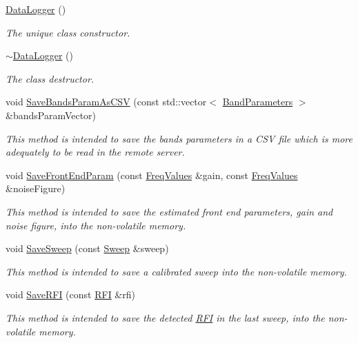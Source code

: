 \begin{DoxyCompactItemize}
\item 
\hyperlink{classDataLogger_a7abebacd4747644d22982f9676466bad}{Data\+Logger} ()
\begin{DoxyCompactList}\small\item\em The unique class constructor. \end{DoxyCompactList}\item 
\mbox{\label{classDataLogger_a9aaff109f3e7749a0a0a0313655da50a}} 
\hyperlink{classDataLogger_a9aaff109f3e7749a0a0a0313655da50a}{$\sim$\+Data\+Logger} ()
\begin{DoxyCompactList}\small\item\em The class destructor. \end{DoxyCompactList}\item 
void \hyperlink{classDataLogger_a2ffe9fb45883c2880e1c45a4406fc22b}{Save\+Bands\+Param\+As\+C\+SV} (const std\+::vector$<$ \hyperlink{structBandParameters}{Band\+Parameters} $>$ \&bands\+Param\+Vector)
\begin{DoxyCompactList}\small\item\em This method is intended to save the bands parameters in a C\+SV file which is more adequately to be read in the remote server. \end{DoxyCompactList}\item 
void \hyperlink{classDataLogger_a058ed66d04269e7d37501ecfe775c067}{Save\+Front\+End\+Param} (const \hyperlink{structFreqValues}{Freq\+Values} \&gain, const \hyperlink{structFreqValues}{Freq\+Values} \&noise\+Figure)
\begin{DoxyCompactList}\small\item\em This method is intended to save the estimated front end parameters, gain and noise figure, into the non-\/volatile memory. \end{DoxyCompactList}\item 
void \hyperlink{classDataLogger_ab2063fcd87971520a5bfa5aef6d73fea}{Save\+Sweep} (const \hyperlink{structSweep}{Sweep} \&sweep)
\begin{DoxyCompactList}\small\item\em This method is intended to save a calibrated sweep into the non-\/volatile memory. \end{DoxyCompactList}\item 
void \hyperlink{classDataLogger_a0c772c3529adc3759ba0e1e596500f65}{Save\+R\+FI} (const \hyperlink{structRFI}{R\+FI} \&rfi)
\begin{DoxyCompactList}\small\item\em This method is intended to save the detected \hyperlink{structRFI}{R\+FI} in the last sweep, into the non-\/volatile memory. \end{DoxyCompactList}\item 

\end{DoxyCompactItemize}
